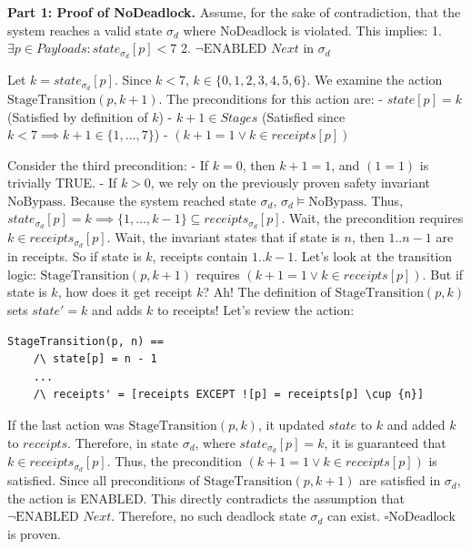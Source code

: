 \textbf{Part 1: Proof of NoDeadlock.}
Assume, for the sake of contradiction, that the system reaches a valid state $\sigma_d$ where $\text{NoDeadlock}$ is violated. This implies:
1. $\exists p \in Payloads : state_{\sigma_d}[p] < 7$
2. $\neg \text{ENABLED } Next$ in $\sigma_d$

Let $k = state_{\sigma_d}[p]$. Since $k < 7$, $k \in \{0, 1, 2, 3, 4, 5, 6\}$.
We examine the action $\text{StageTransition}(p, k+1)$. The preconditions for this action are:
- $state[p] = k$ (Satisfied by definition of $k$)
- $k+1 \in Stages$ (Satisfied since $k < 7 \implies k+1 \in \{1, \dots, 7\}$)
- $(k+1 = 1 \lor k \in receipts[p])$

Consider the third precondition:
- If $k = 0$, then $k+1 = 1$, and $(1 = 1)$ is trivially TRUE.
- If $k > 0$, we rely on the previously proven safety invariant $\text{NoBypass}$. Because the system reached state $\sigma_d$, $\sigma_d \models \text{NoBypass}$. Thus, $state_{\sigma_d}[p] = k \implies \{1, \dots, k-1\} \subseteq receipts_{\sigma_d}[p]$.
Wait, the precondition requires $k \in receipts_{\sigma_d}[p]$. Wait, the invariant states that if state is $n$, then $1..n-1$ are in receipts. So if state is $k$, receipts contain $1..k-1$.
Let's look at the transition logic: $\text{StageTransition}(p, k+1)$ requires $(k+1 = 1 \lor k \in receipts[p])$. But if state is $k$, how does it get receipt $k$?
Ah! The definition of $\text{StageTransition}(p, k)$ sets $state' = k$ and adds $k$ to receipts!
Let's review the action:
\begin{verbatim}
StageTransition(p, n) ==
    /\ state[p] = n - 1
    ...
    /\ receipts' = [receipts EXCEPT ![p] = receipts[p] \cup {n}]
\end{verbatim}
If the last action was $\text{StageTransition}(p, k)$, it updated $state$ to $k$ and added $k$ to $receipts$.
Therefore, in state $\sigma_d$, where $state_{\sigma_d}[p] = k$, it is guaranteed that $k \in receipts_{\sigma_d}[p]$.
Thus, the precondition $(k+1 = 1 \lor k \in receipts[p])$ is satisfied.
Since all preconditions of $\text{StageTransition}(p, k+1)$ are satisfied in $\sigma_d$, the action is ENABLED.
This directly contradicts the assumption that $\neg \text{ENABLED } Next$.
Therefore, no such deadlock state $\sigma_d$ can exist. $\square \text{NoDeadlock}$ is proven.

